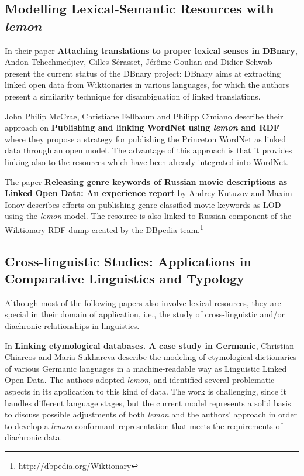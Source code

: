 \subsection{Modelling Lexical-Semantic Resources with \emph{lemon}}

	In their paper \textbf{Attaching translations to proper lexical senses in DBnary}, 
	Andon Tchechmedjiev, Gilles Sérasset, Jérôme Goulian and Didier Schwab 
	present	the current status of the DBnary project: DBnary aims at extracting linked open data from Wiktionaries in various languages, for which 
	the authors present a similarity technique for disambiguation of linked translations. 

	John Philip McCrae, Christiane Fellbaum and Philipp Cimiano describe their approach on \textbf{Publishing and linking WordNet using \emph{lemon} and RDF} where they
	propose a strategy for publishing the Princeton WordNet as linked data through an open model. 
	The advantage of this approach is that it provides linking also to the resources which have been already integrated into WordNet. 	

	The paper \textbf{Releasing genre keywords of Russian movie descriptions as Linked Open Data: An experience report} by Andrey Kutuzov and Maxim Ionov 
	describes efforts on publishing genre-classified movie keywords as LOD using the \emph{lemon} model. 
	The resource is also linked to Russian component of the Wiktionary RDF dump created by the DBpedia team.\footnote{
		\url{http://dbpedia.org/Wiktionary}
	}

\subsection{Cross-linguistic Studies: Applications in Comparative Linguistics and Typology}

Although most of the following papers also involve lexical resources, they are special in their domain of application, i.e., the study of cross-linguistic and/or diachronic relationships in linguistics.

	In \textbf{Linking etymological databases. A case study in Germanic}, Christian Chiarcos and Maria Sukhareva
	describe the modeling of etymological dictionaries of various Germanic languages in a machine-readable way as Linguistic Linked Open Data. 
	The authors adopted \emph{lemon}, and identified several problematic aspects in its application to this kind of data.
	The work is challenging, since it handles different language stages, but the current model represents a solid basis to discuss possible adjustments of both \emph{lemon} and the authors' approach in order to develop a \emph{lemon}-conformant representation that meets the requirements of diachronic data.
		
